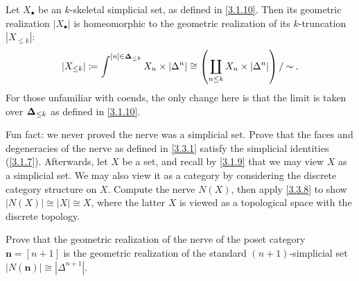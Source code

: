 \begin{corollary}\label{3.3.8}
    Let $X_\bullet$ be an $k$-skeletal simplicial set, as defined in \cref{3.1.10}. Then its geometric realization $|X_\bullet|$ is homeomorphic to the geometric realization of its $k$-truncation $|X_{\leq k}|$:
    \[
	    |X_{\leq k}| \coloneqq\int^{[n]\in\boldsymbol{\Delta}_{\leq k}} X_n\times|\Delta^n|\cong \left( \coprod_{n\leq k} X_n\times \left| \Delta^n \right|  \right) /\mathbin{\sim} .
    \]
    For those unfamiliar with coends, the only change here is that the limit is taken over $\boldsymbol{\Delta}_{\leq k}$ as defined in \cref{3.1.10}.
\end{corollary}

\begin{exercise}\label{3.3.9}
Fun fact: we never proved the nerve was a simplicial set. Prove that the faces and degeneracies of the nerve as defined in \cref{3.3.1} satisfy the simplicial identities (\cref{3.1.7}). Afterwards, let $X$ be a set, and recall by \cref{3.1.9} that we may view $X$ as a simplicial set. We may also view it as a category by considering the discrete category structure on $X$. Compute the nerve $N(X)$, then apply \cref{3.3.8} to show $|N(X)|\cong |X|\cong X$, where the latter $X$ is viewed as a topological space with the discrete topology.
\end{exercise}

\begin{exercise}[Advanced]\label{3.3.10}
	Prove that the geometric realization of the nerve of the poset category $\mathbf{n} =[n+1]$ is the geometric realization of the standard $(n+1)$-simplicial set $|N(\mathbf{n} )|\cong \left| \Delta^{n+1}  \right| $.
\end{exercise}

